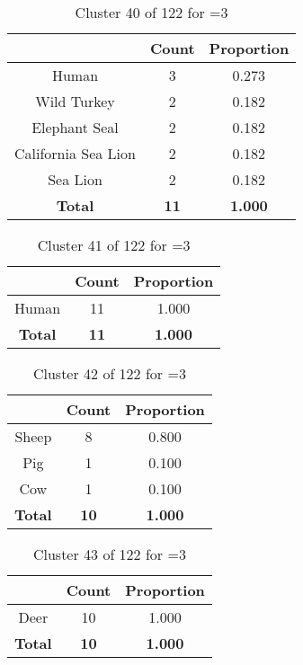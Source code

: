\clearpage
\begin{table}[ht!]
\centering
\begin{tabular}{|c|c|c|}
\hline
\bf \Spec{} &\bf Count &\bf Proportion\\ \hline \hline
Human & 3 & 0.273\\ \hline
Wild Turkey & 2 & 0.182\\ \hline
Elephant Seal & 2 & 0.182\\ \hline
California Sea Lion & 2 & 0.182\\ \hline
Sea Lion & 2 & 0.182\\ \hline
\hline
\bf Total & \bf 11 & \bf 1.000\\ \hline
\end{tabular}
\label{tab:cluster:40:3}
\caption{Cluster 40 of 122 for \minneigh{}=3}
\end{table}

\begin{table}[ht!]
\centering
\begin{tabular}{|c|c|c|}
\hline
\bf \Spec{} &\bf Count &\bf Proportion\\ \hline \hline
Human & 11 & 1.000\\ \hline
\hline
\bf Total & \bf 11 & \bf 1.000\\ \hline
\end{tabular}
\label{tab:cluster:41:3}
\caption{Cluster 41 of 122 for \minneigh{}=3}
\end{table}

\begin{table}[ht!]
\centering
\begin{tabular}{|c|c|c|}
\hline
\bf \Spec{} &\bf Count &\bf Proportion\\ \hline \hline
Sheep & 8 & 0.800\\ \hline
Pig & 1 & 0.100\\ \hline
Cow & 1 & 0.100\\ \hline
\hline
\bf Total & \bf 10 & \bf 1.000\\ \hline
\end{tabular}
\label{tab:cluster:42:3}
\caption{Cluster 42 of 122 for \minneigh{}=3}
\end{table}

\begin{table}[ht!]
\centering
\begin{tabular}{|c|c|c|}
\hline
\bf \Spec{} &\bf Count &\bf Proportion\\ \hline \hline
Deer & 10 & 1.000\\ \hline
\hline
\bf Total & \bf 10 & \bf 1.000\\ \hline
\end{tabular}
\label{tab:cluster:43:3}
\caption{Cluster 43 of 122 for \minneigh{}=3}
\end{table}


